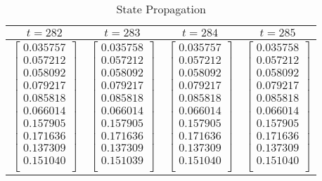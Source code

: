 \documentclass[11pt]{article}
\begin{document}
    \begin{table}[!h] 
    \centering
    \label{6By}
    \caption{State Propagation}
    \begin{tabular}{|c|c|c|c|}
      \hline
    $t=282$ & $t=283$ & $t=284$ & $t=285$  \\
      \hline        
      
$\begin{bmatrix}
   0.035757\\
   0.057212\\
   0.058092\\
   0.079217\\
   0.085818\\
   0.066014\\
   0.157905\\
   0.171636\\
   0.137309\\
   0.151040\\
         \end{bmatrix}$
  &
  $\begin{bmatrix}
   0.035758\\
   0.057212\\
   0.058092\\
   0.079217\\
   0.085818\\
   0.066014\\
   0.157905\\
   0.171636\\
   0.137309\\
   0.151039\\
    \end{bmatrix}$
  &
  $\begin{bmatrix}
   0.035757\\
   0.057212\\
   0.058092\\
   0.079217\\
   0.085818\\
   0.066014\\
   0.157905\\
   0.171636\\
   0.137309\\
   0.151040\\
     \end{bmatrix}$
 &	 
  $\begin{bmatrix}
   0.035758\\
   0.057212\\
   0.058092\\
   0.079217\\
   0.085818\\
   0.066014\\
   0.157905\\
   0.171636\\
   0.137309\\
   0.151040\\
     \end{bmatrix}$\\
      \hline
    \end{tabular}
\end{table}
\end{document}
